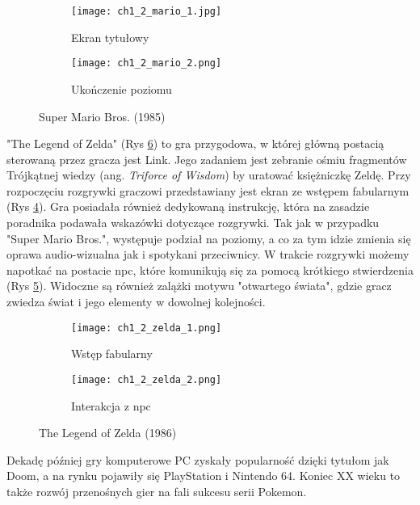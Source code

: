 \begin{figure}[h]
    \begin{subfigure}{0.49\textwidth}
        \caption{Ekran tytułowy}
        \texttt{[image: ch1\_2\_mario\_1.jpg]}
        \label{subfig:ch_1_2_mario_1}
    \end{subfigure}
    \begin{subfigure}{0.49\textwidth}
        \caption{Ukończenie poziomu}
        \texttt{[image: ch1\_2\_mario\_2.png]}
        \label{subfig:ch_1_2_mario_2}
    \end{subfigure}
    \caption{Super Mario Bros. (1985)}
    \label{fig:ch1_2_super_mario_bros}
\end{figure}

"The Legend of Zelda" (Rys \ref{fig:ch1_2_zelda}) to gra przygodowa, w której główną postacią sterowaną
przez gracza jest Link. Jego zadaniem jest zebranie ośmiu fragmentów Trójkątnej wiedzy
(ang. \textit{Triforce of Wisdom}) by uratować księżniczkę Zeldę. Przy rozpoczęciu rozgrywki graczowi
przedstawiany jest ekran ze wstępem fabularnym (Rys \ref{subfig:ch_1_2_zelda_1}). Gra posiadała
również dedykowaną instrukcję, która na zasadzie poradnika podawała wskazówki dotyczące rozgrywki.
Tak jak w przypadku "Super Mario Bros.", występuje podział na poziomy, a co za tym idzie zmienia się
oprawa audio-wizualna jak i spotykani przeciwnicy. W trakcie rozgrywki możemy napotkać na postacie
\gls{npc}, które komunikują się za pomocą krótkiego stwierdzenia
(Rys \ref{subfig:ch_1_2_zelda_2}). Widoczne są również zalążki motywu "otwartego świata", gdzie gracz
zwiedza świat i jego elementy w dowolnej kolejności.

\begin{figure}[h]
    \begin{subfigure}{0.49\textwidth}
        \caption{Wstęp fabularny}
        \texttt{[image: ch1\_2\_zelda\_1.png]}
        \label{subfig:ch_1_2_zelda_1}
    \end{subfigure}
    \begin{subfigure}{0.49\textwidth}
        \caption{Interakcja z \gls{npc}}
        \texttt{[image: ch1\_2\_zelda\_2.png]}
        \label{subfig:ch_1_2_zelda_2}
    \end{subfigure}
    \caption{The Legend of Zelda (1986)}
    \label{fig:ch1_2_zelda}
\end{figure}

Dekadę później gry komputerowe PC zyskały popularność dzięki tytułom jak Doom, a na rynku
pojawiły się PlayStation i Nintendo 64. Koniec XX wieku to także rozwój przenośnych gier na
fali sukcesu serii Pokemon.

